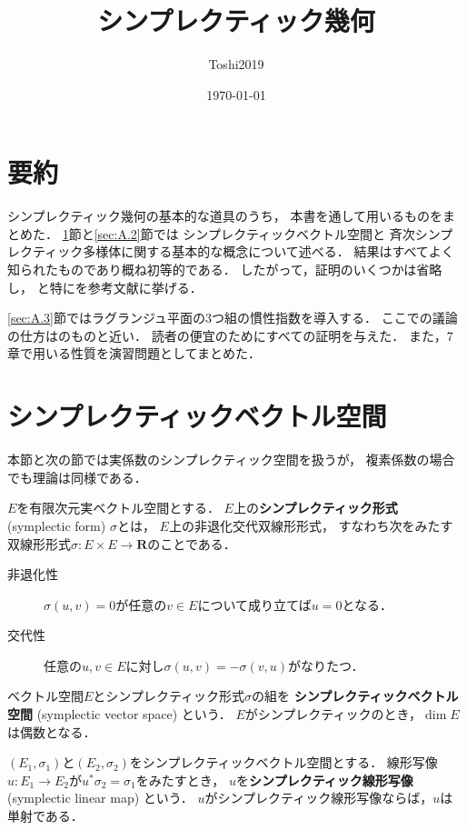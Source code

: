 \documentclass[leqno, 10pt, a4paper, dvipdfmx]{jsarticle}
\title{シンプレクティック幾何}
\author{Toshi2019}
\date{\today}
\theoremstyle{definition}
\newcommand{\rr}{\mathbf{R}}
\numberwithin{equation}{section}
\theoremstyle{mystyle}
\begin{document}
\maketitle

\section*{要約}
シンプレクティック幾何の基本的な道具のうち，
本書を通して用いるものをまとめた．
\ref{sec:A.1}節と\ref{sec:A.2}節では
シンプレクティックベクトル空間と
斉次シンプレクティック多様体に関する基本的な概念について述べる．
結果はすべてよく知られたものであり概ね初等的である．
したがって，証明のいくつかは省略し，
\cite{Ar78,Dui73,AM78}と特に\cite{Hor85}を参考文献に挙げる．

\ref{sec:A.3}節ではラグランジュ平面の3つ組の慣性指数を導入する．
ここでの議論の仕方は\cite{LV80}のものと近い．
読者の便宜のためにすべての証明を与えた．
また，7章で用いる性質を演習問題としてまとめた．

\section{シンプレクティックベクトル空間}\label{sec:A.1}

本節と次の節では実係数のシンプレクティック空間を扱うが，
複素係数の場合でも理論は同様である．

\(E\)を有限次元実ベクトル空間とする．
\(E\)上の\textbf{シンプレクティック形式} (symplectic form) \(\sigma\)とは，
\(E\)上の非退化交代双線形形式，
すなわち次をみたす双線形形式\(
    \sigma\colon E\times E\to\rr
\)のことである．
\begin{description}
    \item[非退化性] \(\sigma(u,v)=0\)が任意の\(v\in E\)について成り立てば\(u=0\)となる．
    \item[交代性] 任意の\(u,v\in E\)に対し\(\sigma(u,v)=-\sigma(v,u)\)がなりたつ．
\end{description}
ベクトル空間\(E\)とシンプレクティック形式\(\sigma\)の組を
\textbf{シンプレクティックベクトル空間} (symplectic vector space) という．
\(E\)がシンプレクティックのとき，\(\dim E\)は偶数となる．

\((E_{1},\sigma_{1})\)と\((E_{2},\sigma_{2})\)をシンプレクティックベクトル空間とする．
線形写像\(u\colon E_{1}\to E_{2}\)が\(
    u^{\ast}\sigma_{2}=\sigma_{1}
\)をみたすとき，
\(u\)を\textbf{シンプレクティック線形写像} (symplectic linear map) という．
\(u\)がシンプレクティック線形写像ならば，\(u\)は単射である．
\end{document}
